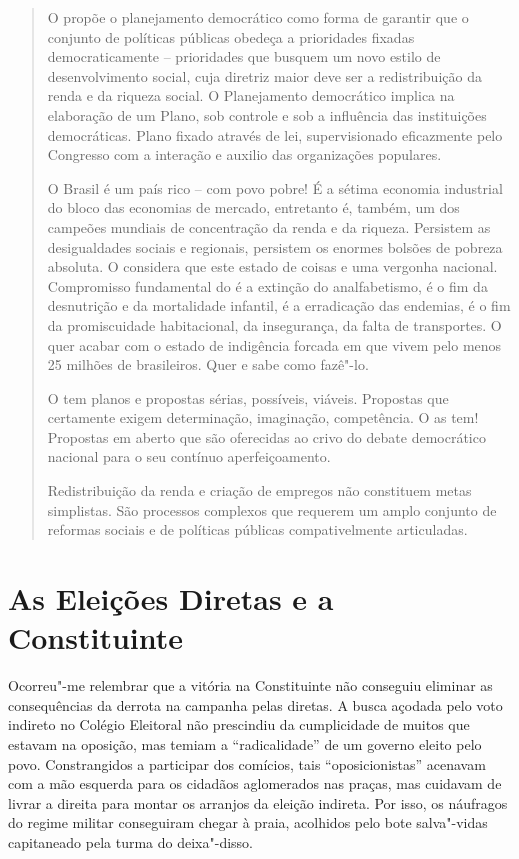 \begin{quote}
O  propõe o planejamento democrático como forma de garantir que o
conjunto de políticas públicas obedeça a prioridades fixadas
democraticamente -- prioridades que busquem um novo estilo de
desenvolvimento social, cuja diretriz maior deve ser a redistribuição da
renda e da riqueza social. O Planejamento democrático implica na
elaboração de um Plano, sob controle e sob a influência das
instituições democráticas. Plano fixado através de lei, supervisionado eficazmente
pelo Congresso com a interação e auxilio das organizações populares.

O Brasil é um país rico -- com povo pobre! É a sétima economia
industrial do bloco das economias de mercado, entretanto é, também, um
dos campeões mundiais de concentração da renda e da riqueza. Persistem
as desigualdades sociais e regionais, persistem os enormes bolsões de
pobreza absoluta. O  considera que este estado de coisas e uma
vergonha nacional. Compromisso fundamental do  é a extinção do
analfabetismo, é o fim da desnutrição e da mortalidade infantil, é a
erradicação das endemias, é o fim da promiscuidade habitacional, da
insegurança, da falta de transportes. O  quer acabar com o estado de
indigência forcada em que vivem pelo menos 25 milhões de brasileiros.
Quer e sabe como fazê"-lo.

O  tem planos e propostas sérias,
possíveis, viáveis. Propostas que certamente exigem determinação,
imaginação, competência. O  as tem! Propostas em aberto que são
oferecidas ao crivo do debate democrático nacional para o seu contínuo
aperfeiçoamento.

Redistribuição da renda e criação de empregos não
constituem metas simplistas. São processos complexos que requerem um
amplo conjunto de reformas sociais e de políticas públicas
compativelmente articuladas.
\end{quote}

\section{As Eleições Diretas e a Constituinte}

Ocorreu"-me relembrar que a vitória na Constituinte não conseguiu
eliminar as consequências da derrota na campanha pelas diretas. A busca
açodada pelo voto indireto no Colégio Eleitoral não prescindiu da
cumplicidade de muitos que estavam na oposição, mas temiam a
``radicalidade'' de um governo eleito pelo povo. Constrangidos a
participar dos comícios, tais ``oposicionistas'' acenavam com a mão
esquerda para os cidadãos aglomerados nas praças, mas cuidavam de livrar
a direita para montar os arranjos da eleição indireta. Por isso, os
náufragos do regime militar conseguiram chegar à praia, acolhidos pelo
bote salva"-vidas capitaneado pela turma do deixa"-disso.

